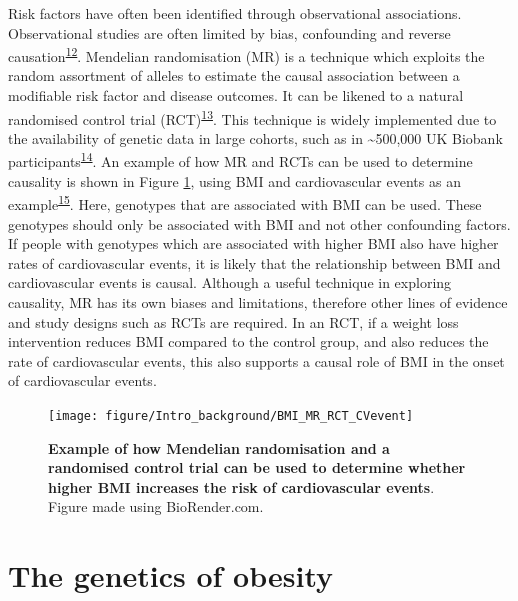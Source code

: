 \documentclass[11pt,twoside]{bristolthesis}
\begin{document}
Risk factors have often been identified through observational associations. Observational studies are often limited by bias, confounding and reverse causation\textsuperscript{\protect\hyperlink{ref-Davies2018}{12}}. Mendelian randomisation (MR) is a technique which exploits the random assortment of alleles to estimate the causal association between a modifiable risk factor and disease outcomes. It can be likened to a natural randomised control trial (RCT)\textsuperscript{\protect\hyperlink{ref-Gill2020}{13}}. This technique is widely implemented due to the availability of genetic data in large cohorts, such as in \textasciitilde500,000 UK Biobank participants\textsuperscript{\protect\hyperlink{ref-Bycroft2018}{14}}. An example of how MR and RCTs can be used to determine causality is shown in Figure \ref{fig:MR-CVevent}, using BMI and cardiovascular events as an example\textsuperscript{\protect\hyperlink{ref-Doney2009}{15}}. Here, genotypes that are associated with BMI can be used. These genotypes should only be associated with BMI and not other confounding factors. If people with genotypes which are associated with higher BMI also have higher rates of cardiovascular events, it is likely that the relationship between BMI and cardiovascular events is causal. Although a useful technique in exploring causality, MR has its own biases and limitations, therefore other lines of evidence and study designs such as RCTs are required. In an RCT, if a weight loss intervention reduces BMI compared to the control group, and also reduces the rate of cardiovascular events, this also supports a causal role of BMI in the onset of cardiovascular events.




\begin{figure}

{\centering \texttt{[image: figure/Intro\_background/BMI\_MR\_RCT\_CVevent]} 

}

\caption[Mendelian randomisation and randomised control trial example using body mass index and cardiovascular events]{\textbf{Example of how Mendelian randomisation and a randomised control trial can be used to determine whether higher BMI increases the risk of cardiovascular events}. Figure made using BioRender.com.}\label{fig:MR-CVevent}
\end{figure}
\hypertarget{the-genetics-of-obesity}{%
\section{The genetics of obesity}\label{the-genetics-of-obesity}}
\end{document}
